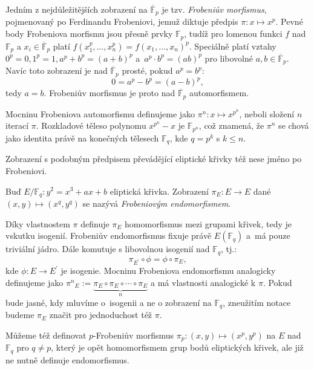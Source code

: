 \documentclass[12pt]{report}
\begin{document}
Jedním z nejdůležitějších zobrazení na $\overline{\mathbb{F}}_p$ je tzv. \textit{Frobeniův morfismus}, pojmenovaný po Ferdinandu Frobeniovi, jemuž diktuje předpis $\pi: x \mapsto x^p$. Pevné body Frobeniova morfismu jsou přesně prvky $\mathbb{F}_p$, tudíž pro lomenou funkci $f$ nad $\mathbb{F}_p$ a $x_i \in \overline{\mathbb{F}}_p$ platí $f(x_1^p,\dots,x_n^p)=f(x_1,\dots,x_n)^p$. Speciálně platí vztahy $0^p = 0, 1^p = 1, a^p + b^p = (a+b)^p$ a~$a^p \cdot b^p = (ab)^p$ pro libovolné $a,b \in \overline{\mathbb{F}}_p$. Navíc toto zobrazení je nad $\overline{\mathbb{F}}_p$ prosté, pokud $a^p = b^p$:
\begin{equation*}
0 = a^p - b^p =  (a-b)^p,
\end{equation*} tedy $a=b$. Frobeniův morfismus je proto nad $\overline{\mathbb{F}}_p$ automorfismem.

Mocninu Frobeniova automorfismu definujeme jako $\pi^n : x \mapsto x^{p^n}$, neboli složení $n$ iterací $\pi$. Rozkladové těleso polynomu $x^{p^n}-x$ je $\mathbb{F}_{p^n}$, což znamená, že $\pi^n$ se chová jako identita právě na konečných tělesech $\mathbb{F}_q$, kde $q =p^k$ s $k \leqslant n$. 

Zobrazení s podobným předpisem převádějící eliptické křivky též nese jméno po Frobeniovi.
\begin{definice}
Buď $E/\mathbb{F}_q: y^2 = x^3+ax+b$ eliptická křivka. Zobrazení $\pi_E : E \longrightarrow E$ dané $(x,y) \longmapsto (x^q,y^q)$ se nazývá \textit{Frobeniovým endomorfismem}.
\end{definice}

Díky vlastnostem $\pi$ definuje $\pi_E$ homomorfismus mezi grupami křivek, tedy je vskutku isogenií. Frobeniův endomorfismus fixuje právě $E(\mathbb{F}_q)$ a~má pouze triviální jádro. Dále komutuje s libovolnou isogenií nad $\mathbb{F}_q$, tj.:
\begin{equation*}
\pi_{E^\prime} \circ \phi = \phi \circ \pi_E,
\end{equation*}
kde $\phi : E \longrightarrow E^\prime$ je isogenie. Mocninu Frobeniova endomorfismu analogicky definujeme jako ${\pi^n}_E := \underbrace{\pi_E \circ \pi_E \circ \cdots \circ \pi_E}_{n}$ a má vlastnosti analogické k $\pi$. Pokud bude jasné, kdy mluvíme o~isogenii a ne o zobrazení na $\mathbb{F}_q$, zneužitím notace budeme $\pi_E$ značit pro jednoduchost též $\pi$.

Můžeme též definovat $p$-Frobeniův morfismus $\pi_p : (x,y) \mapsto (x^p,y^p)$ na $E$ nad $\mathbb{F}_q$ pro $q \neq p$, který je opět homomorfismem grup bodů eliptických křivek, ale již ne nutně definuje endomorfismus.
\end{document}
